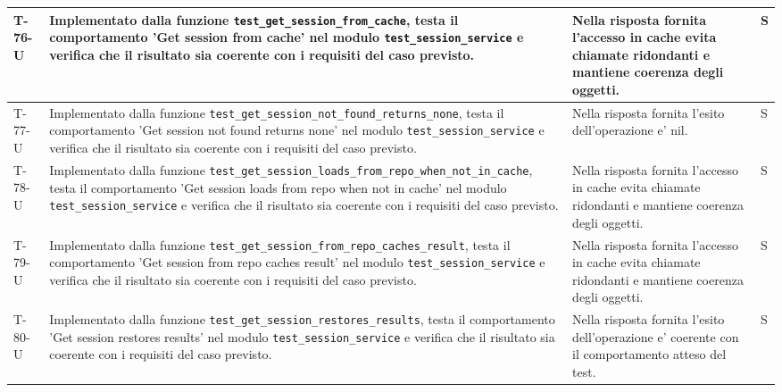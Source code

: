\documentclass[a4paper,12pt]{article}
\begin{document}
{{\begin{longtable}{|>{\RaggedRight\arraybackslash}p{1.55cm}|>{\RaggedRight\arraybackslash}p{8.0cm}|>{\RaggedRight\arraybackslash}p{4.6cm}|>{\RaggedRight\arraybackslash}p{1.2cm}|}
        \hline
        T-76-U & Implementato dalla funzione \texttt{test\_\allowbreak get\_\allowbreak session\_\allowbreak from\_\allowbreak cache}, testa il comportamento 'Get session from cache' nel modulo \texttt{test\_\allowbreak session\_\allowbreak service} e verifica che il risultato sia coerente con i requisiti del caso previsto. & Nella risposta fornita l'accesso in cache evita chiamate ridondanti e mantiene coerenza degli oggetti. & S \\
        \hline
        T-77-U & Implementato dalla funzione \texttt{test\_\allowbreak get\_\allowbreak session\_\allowbreak not\_\allowbreak found\_\allowbreak returns\_\allowbreak none}, testa il comportamento 'Get session not found returns none' nel modulo \texttt{test\_\allowbreak session\_\allowbreak service} e verifica che il risultato sia coerente con i requisiti del caso previsto. & Nella risposta fornita l'esito dell'operazione e' nil. & S \\
        \hline
        T-78-U & Implementato dalla funzione \texttt{test\_\allowbreak get\_\allowbreak session\_\allowbreak loads\_\allowbreak from\_\allowbreak repo\_\allowbreak when\_\allowbreak not\_\allowbreak in\_\allowbreak cache}, testa il comportamento 'Get session loads from repo when not in cache' nel modulo \texttt{test\_\allowbreak session\_\allowbreak service} e verifica che il risultato sia coerente con i requisiti del caso previsto. & Nella risposta fornita l'accesso in cache evita chiamate ridondanti e mantiene coerenza degli oggetti. & S \\
        \hline
        T-79-U & Implementato dalla funzione \texttt{test\_\allowbreak get\_\allowbreak session\_\allowbreak from\_\allowbreak repo\_\allowbreak caches\_\allowbreak result}, testa il comportamento 'Get session from repo caches result' nel modulo \texttt{test\_\allowbreak session\_\allowbreak service} e verifica che il risultato sia coerente con i requisiti del caso previsto. & Nella risposta fornita l'accesso in cache evita chiamate ridondanti e mantiene coerenza degli oggetti. & S \\
        \hline
        T-80-U & Implementato dalla funzione \texttt{test\_\allowbreak get\_\allowbreak session\_\allowbreak restores\_\allowbreak results}, testa il comportamento 'Get session restores results' nel modulo \texttt{test\_\allowbreak session\_\allowbreak service} e verifica che il risultato sia coerente con i requisiti del caso previsto. & Nella risposta fornita l'esito dell'operazione e' coerente con il comportamento atteso del test. & S \\

\end{longtable}}}
\end{document}
